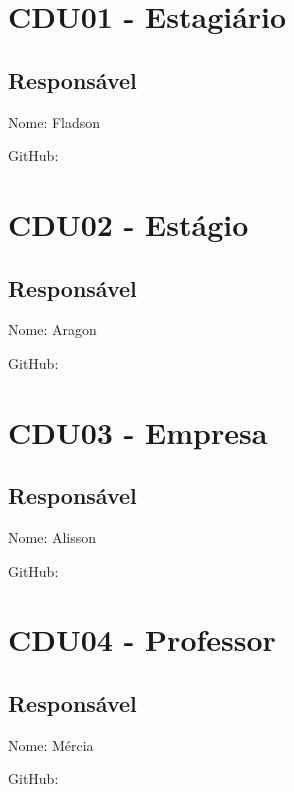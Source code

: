 \documentclass{report}
\begin{document}
\section{CDU01 - Estagiário}

\subsection{Responsável}

Nome: Fladson

GitHub:



\section{CDU02 - Estágio}

\subsection{Responsável}

Nome: Aragon

GitHub:



\section{CDU03 - Empresa}

\subsection{Responsável}

Nome: Alisson

GitHub:



\section{CDU04 - Professor}

\subsection{Responsável}

Nome: Mércia

GitHub:


\end{document}
